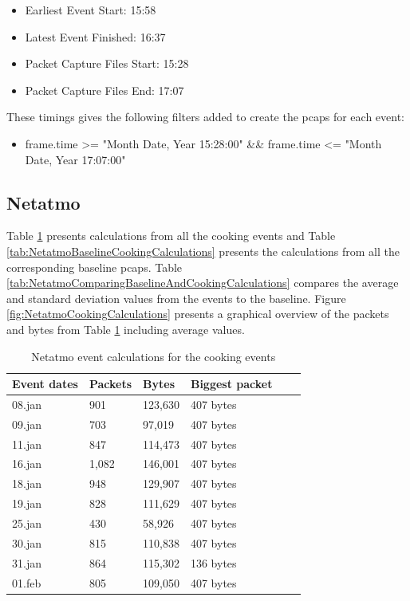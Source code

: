 \begin{itemize}
    \item Earliest Event Start: 15:58
    \item Latest Event Finished: 16:37
    \item Packet Capture Files Start: 15:28
    \item Packet Capture Files End: 17:07
\end{itemize}

These timings gives the following filters added to create the pcaps for each event:

\begin{itemize}
    \item frame.time >= "Month Date, Year 15:28:00" \&\& frame.time <= "Month Date, Year 17:07:00"
\end{itemize}

\newpage
\subsection{Netatmo}
Table \ref{tab:NetatmoCookingCalculations} presents calculations from all the cooking events and Table \ref{tab:NetatmoBaselineCookingCalculations} presents the calculations from all the corresponding baseline pcaps. Table \ref{tab:NetatmoComparingBaselineAndCookingCalculations} compares the average and standard deviation values from the events to the baseline. Figure \ref{fig:NetatmoCookingCalculations} presents a graphical overview of the packets and bytes from Table \ref{tab:NetatmoCookingCalculations} including average values.

\begin{table}[H]
    \centering
    \caption{Netatmo event calculations for the cooking events}
    \begin{tabular}{|l|l|l|l|l|l|}
    \hline
        \textbf{Event dates} & \textbf{Packets} & \textbf{Bytes} & \textbf{Biggest packet} \\ \hline
        08.jan & 901 & 123,630 & 407 bytes\\ \hline
        09.jan & 703 & 97,019 & 407 bytes \\ \hline
        11.jan & 847 & 114,473 & 407 bytes\\ \hline
        16.jan & 1,082 & 146,001 & 407 bytes\\ \hline
        18.jan & 948 & 129,907 & 407 bytes\\ \hline
        19.jan & 828 & 111,629 & 407 bytes \\ \hline
        25.jan & 430 & 58,926 & 407 bytes \\ \hline
        30.jan & 815 & 110,838 & 407 bytes \\ \hline
        31.jan & 864 & 115,302 & 136 bytes \\ \hline
        01.feb & 805 & 109,050 & 407 bytes \\ \hline
    \end{tabular}
    \label{tab:NetatmoCookingCalculations}
\end{table}

